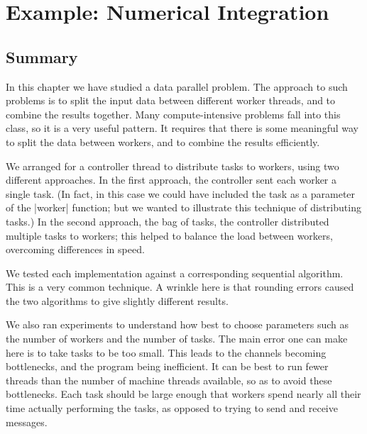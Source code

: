 \chapter{Example: Numerical Integration}



\section{Summary}

In this chapter we have studied a data parallel problem.  The approach to such
problems is to split the input data between different worker threads, and to
combine the results together.  Many compute-intensive problems fall into this
class, so it is a very useful pattern.  It  requires that there is some
meaningful way to split the data between workers, and to combine the results
efficiently.

We arranged for a controller thread to distribute tasks to workers, using two
different approaches.  In the first approach, the controller sent each worker
a single task.  (In fact, in this case we could have included the task as a
parameter of the |worker| function; but we wanted to illustrate this technique
of distributing tasks.)  In the second approach, the bag of tasks, the
controller distributed multiple tasks to workers; this helped to balance the
load between workers, overcoming differences in speed.

We tested each implementation against a corresponding sequential algorithm.
This is a very common technique.  A wrinkle here is that rounding errors
caused the two algorithms to give slightly different results.  

We also ran experiments to understand how best to choose parameters such as
the number of workers and the number of tasks.  The main error one can make
here is to take tasks to be too small.  This leads to the channels becoming
bottlenecks, and the program being inefficient.  It can be best to run fewer
threads than the number of machine threads available, so as to avoid these
bottlenecks.  Each task should be large enough that workers spend nearly all
their time actually performing the tasks, as opposed to trying to send and
receive messages.  

